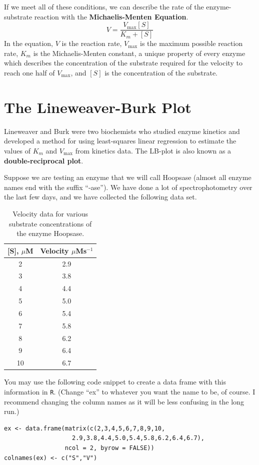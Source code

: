 \documentclass[11pt]{article}
\newcommand{\np}{\vfill\newpage}
\newcommand{\R}{\texttt{R}}
\begin{document}
If we meet all of these conditions, we can describe the rate of the enzyme-substrate reaction with the {\bf Michaelis-Menten Equation}.
\[
V = \frac{V_{\mathrm{max}}[S]}{K_m + [S]}
\]
In the equation, \(V\) is the reaction rate, \(V_{\mathrm{max}}\) is the maximum possible reaction rate, \(K_m\) is the Michaelis-Menten constant, a unique property of every enzyme which describes the concentration of the substrate required for the velocity to reach one half of \(V_{\mathrm{max}}\), and \([S]\) is the concentration of the substrate.

\np

\section*{The Lineweaver-Burk Plot}

Lineweaver and Burk were two biochemists who studied enzyme kinetics and developed a method for using least-squares linear regression to estimate the values of \(K_m\) and \(V_{\mathrm{max}}\) from kinetics data. The LB-plot is also known as a {\bf double-reciprocal plot}. 

Suppose we are testing an enzyme that we will call Hoopsase (almost all enzyme names end with the suffix ``-ase''). We have done a lot of spectrophotometry over the last few days, and we have collected the following data set.

\begin{table}[h!]
\centering
\begin{tabular}{c|c}
	[S], \(\mu\)M & Velocity \(\mu\)Ms\(^{-1}\) \\
	\hline
	2 & 2.9 \\
	3 & 3.8 \\
	4 & 4.4 \\
	5 & 5.0 \\
	6 & 5.4 \\
	7 & 5.8 \\
	8 & 6.2 \\
	9 & 6.4 \\
	10 & 6.7 
\end{tabular}
\caption{Velocity data for various substrate concentrations of the enzyme Hoopsase.}
\label{t:Hoopsase}
\end{table}

You may use the following code snippet to create a data frame with this information in \R. (Change ``ex'' to whatever you want the name to be, of course. I recommend changing the column names as it will be less confusing in the long run.)
\begin{lstlisting}
ex <- data.frame(matrix(c(2,3,4,5,6,7,8,9,10,
                   2.9,3.8,4.4,5.0,5.4,5.8,6.2,6.4,6.7),
                 ncol = 2, byrow = FALSE))
colnames(ex) <- c("S","V")
\end{lstlisting}
\end{document}
